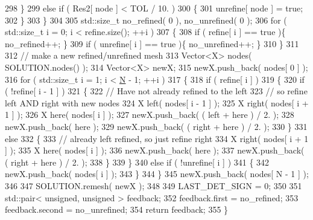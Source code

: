 \begin{DoxyCode}
298       \}
299       \textcolor{keywordflow}{else} \textcolor{keywordflow}{if} ( Res2[ node ] < TOL / 10. )
300       \{
301         unrefine[ node ] = \textcolor{keyword}{true};
302       \}
303     \}
304 
305     std::size\_t no\_refined( 0 ), no\_unrefined( 0 );
306     \textcolor{keywordflow}{for} ( std::size\_t i = 0; i < refine.size(); ++i )
307     \{
308       \textcolor{keywordflow}{if} ( refine[ i ] == \textcolor{keyword}{true} )\{ no\_refined++; \}
309       \textcolor{keywordflow}{if} ( unrefine[ i ] == \textcolor{keyword}{true} )\{ no\_unrefined++; \}
310     \}
311 
312     \textcolor{comment}{// make a new refined/unrefined mesh}
313     Vector<X> nodes( SOLUTION.nodes() );
314     Vector<X> newX;
315     newX.push\_back( nodes[ 0 ] );
316     \textcolor{keywordflow}{for} ( std::size\_t i = 1; i < \hyperlink{namespaceHeat__plot_a7d050092798e28458a263710837bda77}{N} - 1; ++i )
317     \{
318       \textcolor{keywordflow}{if} ( refine[ i ] )
319       \{
320         \textcolor{keywordflow}{if} ( !refine[ i - 1 ] )
321         \{
322           \textcolor{comment}{// Have not already refined to the left}
323           \textcolor{comment}{// so refine left AND right with new nodes}
324           X left( nodes[ i - 1 ] );
325           X right( nodes[ i + 1 ] );
326           X here( nodes[ i ] );
327           newX.push\_back( ( left + here ) / 2. );
328           newX.push\_back( here );
329           newX.push\_back( ( right + here ) / 2. );
330         \}
331         \textcolor{keywordflow}{else}
332         \{
333           \textcolor{comment}{// already left refined, so just refine right}
334           X right( nodes[ i + 1 ] );
335           X here( nodes[ i ] );
336           newX.push\_back( here );
337           newX.push\_back( ( right + here ) / 2. );
338         \}
339       \}
340       \textcolor{keywordflow}{else} \textcolor{keywordflow}{if} ( !unrefine[ i ] )
341       \{
342         newX.push\_back( nodes[ i ] );
343       \}
344     \}
345     newX.push\_back( nodes[ N - 1 ] );
346 
347     SOLUTION.remesh( newX );
348 
349     LAST\_DET\_SIGN = 0;
350 
351     std::pair< unsigned, unsigned > feedback;
352     feedback.first = no\_refined;
353     feedback.second = no\_unrefined;
354     \textcolor{keywordflow}{return} feedback;
355   \}
\end{DoxyCode}
\mbox{\label{classLuna_1_1ODE__BVP_a8da2eba83d2bb58a5e87f77ce3620056}} 
